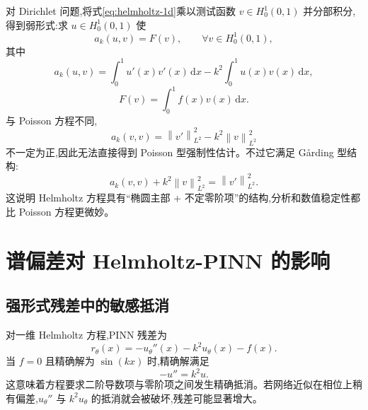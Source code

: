 \documentclass[12pt,hyperref,a4paper,UTF8,twoside]{ctexart}
\newcommand{\dd}{\mathrm d}
\newcommand{\norm}[1]{\left\lVert #1\right\rVert}
\begin{document}
对 Dirichlet 问题,将式\eqref{eq:helmholtz-1d}乘以测试函数 $v\in H_0^1(0,1)$ 并分部积分,得到弱形式:求 $u\in H_0^1(0,1)$ 使
\begin{equation}\label{eq:helmholtz-weak}
    a_k(u,v)=F(v),\qquad \forall v\in H_0^1(0,1),
\end{equation}
其中
\begin{equation}\label{eq:helmholtz-bilinear}
    a_k(u,v)=\int_0^1 u'(x)v'(x)\,\dd x-k^2\int_0^1u(x)v(x)\,\dd x,
\end{equation}
\begin{equation}\label{eq:right-hand-functional}
    F(v)=\int_0^1 f(x)v(x)\,\dd x.
\end{equation}
与 Poisson 方程不同,
\begin{equation}\label{eq:not-coercive}
    a_k(v,v)=\norm{v'}_{L^2}^2-k^2\norm{v}_{L^2}^2
\end{equation}
不一定为正,因此无法直接得到 Poisson 型强制性估计。不过它满足 G\aa rding 型结构:
\begin{equation}\label{eq:garding}
    a_k(v,v)+k^2\norm{v}_{L^2}^2=\norm{v'}_{L^2}^2.
\end{equation}
这说明 Helmholtz 方程具有“椭圆主部 + 不定零阶项”的结构,分析和数值稳定性都比 Poisson 方程更微妙。

\section{谱偏差对 Helmholtz-PINN 的影响}

\subsection{强形式残差中的敏感抵消}

对一维 Helmholtz 方程,PINN 残差为
\begin{equation}\label{eq:helmholtz-residual}
    r_\theta(x)=-u_\theta''(x)-k^2u_\theta(x)-f(x).
\end{equation}
当 $f=0$ 且精确解为 $\sin(kx)$ 时,精确解满足
\begin{equation}\label{eq:sensitive-cancel}
    -u''=k^2u.
\end{equation}
这意味着方程要求二阶导数项与零阶项之间发生精确抵消。若网络近似在相位上稍有偏差,$u_\theta''$ 与 $k^2u_\theta$ 的抵消就会被破坏,残差可能显著增大。
\end{document}
